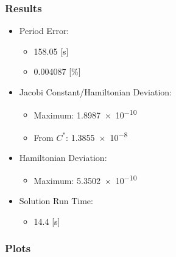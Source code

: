 \documentclass{article}
\begin{document}
\subsubsection{Results}

\begin{itemize}
    \item Period Error:
    \begin{itemize}
        \item 158.05 [s]
        \item 0.004087 [\%]
    \end{itemize}
    \item Jacobi Constant/Hamiltonian Deviation:
    \begin{itemize}
        \item Maximum: \num{1.8987e-10}
        \item From $C^*$: \num{1.3855e-8}
    \end{itemize}
    \item Hamiltonian Deviation:
    \begin{itemize}
        \item Maximum: \num{5.3502e-10}
    \end{itemize}
    \item Solution Run Time:
    \begin{itemize}
        \item 14.4 [s]
    \end{itemize}  
\end{itemize}

\newpage

\subsubsection{Plots}
\end{document}
